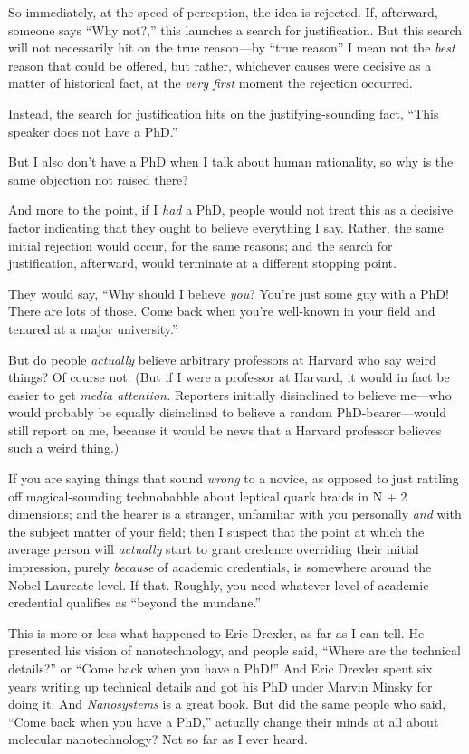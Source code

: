 {
 So immediately, at the speed of perception, the idea is rejected.
If, afterward, someone says ``Why
not?,'' this launches a search for justification. But
this search will not necessarily hit on the true reason---by
``true reason'' I mean not the
\textit{best} reason that could be offered, but rather, whichever
causes were decisive as a matter of historical fact, at the
\textit{very first} moment the rejection occurred.}

{
 Instead, the search for justification hits on the
justifying-sounding fact, ``This speaker does not have
a PhD.''}

{
 But I also don't have a PhD when I talk about
human rationality, so why is the same objection not raised there?}

{
 And more to the point, if I \textit{had} a PhD, people would not
treat this as a decisive factor indicating that they ought to believe
everything I say. Rather, the same initial rejection would occur, for
the same reasons; and the search for justification, afterward, would
terminate at a different stopping point.}

{
 They would say, ``Why should I believe
\textit{you}? You're just some guy with a PhD! There
are lots of those. Come back when you're well-known in
your field and tenured at a major university.''}

{
 But do people \textit{actually} believe arbitrary professors at
Harvard who say weird things? Of course not. (But if I were a professor
at Harvard, it would in fact be easier to get \textit{media attention.}
Reporters initially disinclined to believe me---who would probably be
equally disinclined to believe a random PhD-bearer---would still report
on me, because it would be news that a Harvard professor believes such
a weird thing.)}

{
 If you are saying things that sound \textit{wrong} to a novice, as
opposed to just rattling off magical-sounding technobabble about
leptical quark braids in N + 2 dimensions; and the hearer is a
stranger, unfamiliar with you personally \textit{and} with the subject
matter of your field; then I suspect that the point at which the
average person will \textit{actually} start to grant credence
overriding their initial impression, purely \textit{because} of
academic credentials, is somewhere around the Nobel Laureate level. If
that. Roughly, you need whatever level of academic credential qualifies
as ``beyond the mundane.''}

{
 This is more or less what happened to Eric Drexler, as far as I
can tell. He presented his vision of nanotechnology, and people said,
``Where are the technical details?''
or ``Come back when you have a
PhD!'' And Eric Drexler spent six years writing up
technical details and got his PhD under Marvin Minsky for doing it. And
\textit{Nanosystems} is a great book. But did the same people who said,
``Come back when you have a PhD,''
actually change their minds at all about molecular nanotechnology? Not
so far as I ever heard.}

